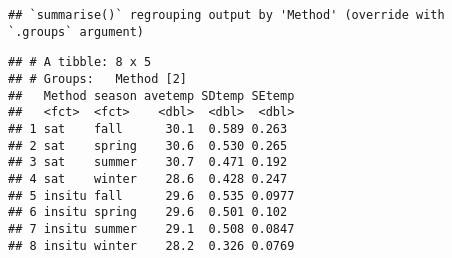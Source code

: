 \documentclass[
]{article}
\begin{document}
\begin{verbatim}
## `summarise()` regrouping output by 'Method' (override with `.groups` argument)
\end{verbatim}

\begin{verbatim}
## # A tibble: 8 x 5
## # Groups:   Method [2]
##   Method season avetemp SDtemp SEtemp
##   <fct>  <fct>    <dbl>  <dbl>  <dbl>
## 1 sat    fall      30.1  0.589 0.263 
## 2 sat    spring    30.6  0.530 0.265 
## 3 sat    summer    30.7  0.471 0.192 
## 4 sat    winter    28.6  0.428 0.247 
## 5 insitu fall      29.6  0.535 0.0977
## 6 insitu spring    29.6  0.501 0.102 
## 7 insitu summer    29.1  0.508 0.0847
## 8 insitu winter    28.2  0.326 0.0769
\end{verbatim}
\end{document}
